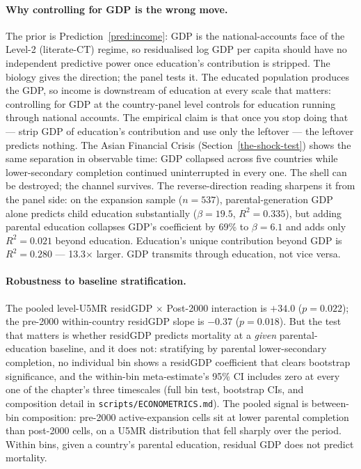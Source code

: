 \documentclass[12pt,letterpaper]{article}
\begin{document}
\paragraph{Why controlling for GDP is the wrong move.}
The prior is Prediction~\ref{pred:income}: GDP is the national-accounts
face of the Level-2 (literate-CT) regime, so residualised log GDP per
capita should have no independent predictive power once education's
contribution is stripped. The biology gives the direction; the panel
tests it. The educated population produces the GDP, so income is
downstream of education at every scale that matters: controlling for
GDP at the country-panel level controls for education running through
national accounts. The empirical claim is that once you stop doing that ---
strip GDP of education's contribution and use only the leftover ---
the leftover predicts nothing. The Asian Financial Crisis
(Section~\ref{the-shock-test}) shows the same separation in observable
time: GDP collapsed across five countries while lower-secondary
completion continued uninterrupted in every one. The shell
can be destroyed; the channel survives. The reverse-direction reading
sharpens it from the panel side: on the expansion sample ($n=537$),
parental-generation GDP alone predicts child education substantially
($\beta=19.5$, $R^2=0.335$), but adding parental education collapses
GDP's coefficient by 69\% to $\beta=6.1$ and adds only $R^2=0.021$
beyond education. Education's unique contribution beyond GDP is
$R^2=0.280$ --- 13.3$\times$ larger. GDP transmits through education,
not vice versa.

\paragraph{Robustness to baseline stratification.}
The pooled level-U5MR residGDP $\times$ Post-2000 interaction is
$+34.0$ ($p=0.022$); the pre-2000 within-country residGDP slope is
$-0.37$ ($p=0.018$). But the test that matters is whether residGDP
predicts mortality at a \emph{given} parental-education baseline, and
it does not: stratifying by parental lower-secondary completion, no
individual bin shows a residGDP coefficient that clears bootstrap
significance, and the within-bin meta-estimate's 95\% CI includes zero
at every one of the chapter's three timescales (full bin test,
bootstrap CIs, and composition detail in
\texttt{scripts/ECONOMETRICS.md}). The pooled signal is between-bin
composition: pre-2000 active-expansion cells sit at lower parental
completion than post-2000 cells, on a U5MR distribution that fell
sharply over the period. Within bins, given a country's parental
education, residual GDP does not predict mortality.
\end{document}
